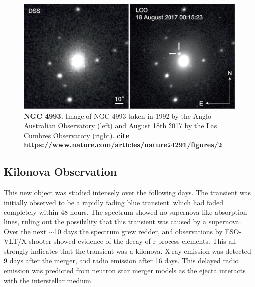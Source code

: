 \documentclass[11pt]{cuthesis}
\begin{document}
\begin{figure} %
\begin{center}
\includegraphics[width=0.8\linewidth]{NGC4993.jpg}
\end{center}
\caption{\textbf{NGC 4993.} Image of NGC 4993 taken in 1992 by the Anglo-Australian Observatory (left) and August 18th 2017 by the Las Cumbres Observatory (right). \textbf{cite https://www.nature.com/articles/nature24291/figures/2} }
\label{fig:NGC4993}
\end{figure}

\subsection{Kilonova Observation}
This new object was studied intensely over the following days. The transient was initially observed to be a rapidly fading blue transient, which had faded completely within 48 hours. The spectrum showed no supernova-like absorption lines, ruling out the possibility that this transient was caused by a supernova. Over the next $\sim$10 days the spectrum grew redder, and observations by ESO-VLT/X-shooter showed evidence of the decay of r-process elements. This all strongly indicates that the transient was a kilonova. X-ray emission was detected 9 days after the merger, and radio emission after 16 days. This delayed radio emission was predicted from neutron star merger models as the ejecta interacts with the interstellar medium.
\end{document}
